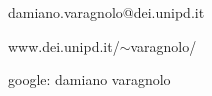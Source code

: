 
\begin{frame}
	\titlepage
	\begin{center}
		damiano.varagnolo@dei.unipd.it
		
		www.dei.unipd.it/$\sim$varagnolo/
		
		google: damiano varagnolo
	\end{center}
	
\end{frame}
